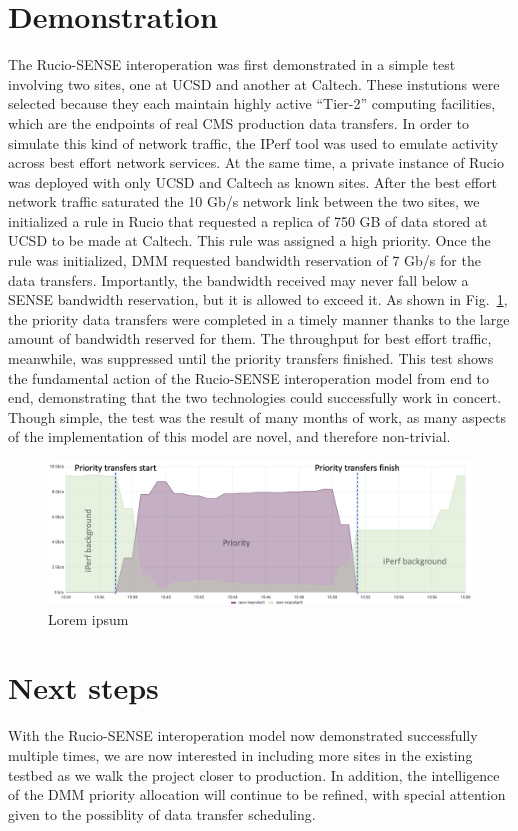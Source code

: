 \section{Demonstration}
The Rucio-SENSE interoperation was first demonstrated in a simple test involving two sites, one at UCSD and another at Caltech. 
These instutions were selected because they each maintain highly active ``Tier-2'' computing facilities, which are the endpoints of real CMS production data transfers. 
In order to simulate this kind of network traffic, the IPerf tool was used to emulate activity across best effort network services. 
At the same time, a private instance of Rucio was deployed with only UCSD and Caltech as known sites. 
After the best effort network traffic saturated the 10 Gb/s network link between the two sites, we initialized a rule in Rucio that requested a replica of 750 GB of data stored at UCSD to be made at Caltech. 
This rule was assigned a high priority. 
Once the rule was initialized, DMM requested bandwidth reservation of 7 Gb/s for the data transfers. 
Importantly, the bandwidth received may never fall below a SENSE bandwidth reservation, but it is allowed to exceed it. 
As shown in Fig.~\ref{fig:rucio_sense_demo}, the priority data transfers were completed in a timely manner thanks to the large amount of bandwidth reserved for them. 
The throughput for best effort traffic, meanwhile, was suppressed until the priority transfers finished. 
This test shows the fundamental action of the Rucio-SENSE interoperation model from end to end, demonstrating that the two technologies could successfully work in concert. 
Though simple, the test was the result of many months of work, as many aspects of the implementation of this model are novel, and therefore non-trivial. 

\begin{figure}[htb]
  \centering
  \includegraphics[width=.9\textwidth]{fig/cyber/rucio-sense_demo.png}
  \caption{Lorem ipsum}
  \label{fig:rucio_sense_demo}
\end{figure}

\section{Next steps}
With the Rucio-SENSE interoperation model now demonstrated successfully multiple times, we are now interested in including more sites in the existing testbed as we walk the project closer to production. 
In addition, the intelligence of the DMM priority allocation will continue to be refined, with special attention given to the possiblity of data transfer scheduling. 

